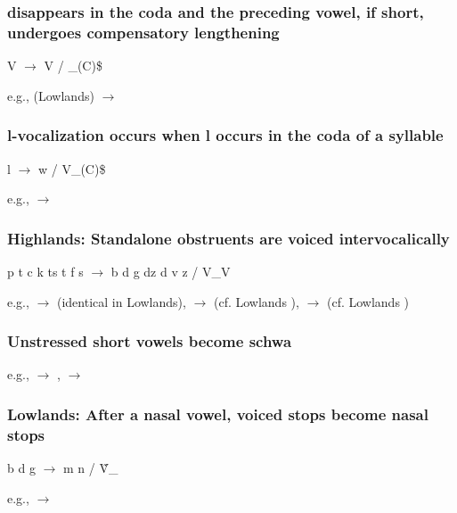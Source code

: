 
\subsubsection{\phipa{\alvrap} disappears in the coda and the preceding vowel, if short, undergoes compensatory lengthening}

\begin{center}
    V\alvrap{} $\to$ V\lgth{} / \_(C)\$
\end{center}

e.g.,  (Lowlands)  $\to$ 

\subsubsection{l-vocalization occurs when l occurs in the coda of a syllable}

\begin{center}
    l $\to$ w / V\_(C)\$
\end{center}

e.g.,   $\to$ 

\subsubsection{{\sc Highlands:} Standalone obstruents are voiced intervocalically}

\begin{center}
    p t c k t\tiebar s t\tiebar\esh{} f s \esh{} $\to$ b d \paljstop{} g d\tiebar z d\tiebar\ezh{} v z \ezh{} / V\_V
\end{center}

e.g.,   $\to$  (identical in Lowlands),   $\to$  (cf. Lowlands ),   $\to$  (cf. Lowlands )

\subsubsection{Unstressed short vowels become schwa}

e.g.,   $\to$ ,   $\to$ 

\subsubsection{{\sc Lowlands:} After a nasal vowel, voiced stops become nasal stops}

\begin{center}
    b d \paljstop{} g $\to$ m n \egna{} \engma{} / \~{V}\_
\end{center}

e.g.,   $\to$ 